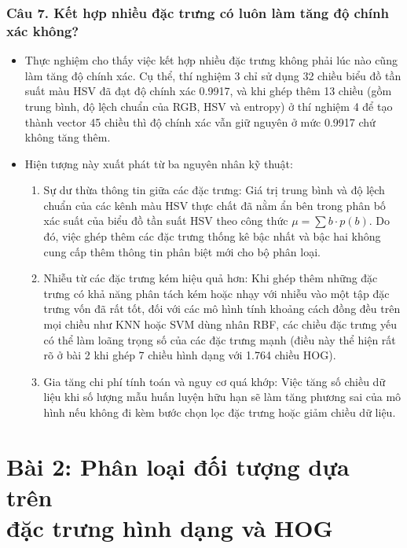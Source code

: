 \documentclass[12pt,a4paper]{article}
\begin{document}
\subsubsection*{Câu 7. Kết hợp nhiều đặc trưng có luôn làm tăng độ chính xác không?}
\begin{itemize}
    \item Thực nghiệm cho thấy việc kết hợp nhiều đặc trưng không phải lúc nào cũng làm tăng độ chính xác. Cụ thể, thí nghiệm 3 chỉ sử dụng 32 chiều biểu đồ tần suất màu HSV đã đạt độ chính xác 0.9917, và khi ghép thêm 13 chiều (gồm trung bình, độ lệch chuẩn của RGB, HSV và entropy) ở thí nghiệm 4 để tạo thành vector 45 chiều thì độ chính xác vẫn giữ nguyên ở mức 0.9917 chứ không tăng thêm.
    \item Hiện tượng này xuất phát từ ba nguyên nhân kỹ thuật:
    \begin{enumerate}
        \item Sự dư thừa thông tin giữa các đặc trưng: Giá trị trung bình và độ lệch chuẩn của các kênh màu HSV thực chất đã nằm ẩn bên trong phân bố xác suất của biểu đồ tần suất HSV theo công thức $\mu = \sum b \cdot p(b)$. Do đó, việc ghép thêm các đặc trưng thống kê bậc nhất và bậc hai không cung cấp thêm thông tin phân biệt mới cho bộ phân loại.
        \item Nhiễu từ các đặc trưng kém hiệu quả hơn: Khi ghép thêm những đặc trưng có khả năng phân tách kém hoặc nhạy với nhiễu vào một tập đặc trưng vốn đã rất tốt, đối với các mô hình tính khoảng cách đồng đều trên mọi chiều như KNN hoặc SVM dùng nhân RBF, các chiều đặc trưng yếu có thể làm loãng trọng số của các đặc trưng mạnh (điều này thể hiện rất rõ ở bài 2 khi ghép 7 chiều hình dạng với 1.764 chiều HOG).
        \item Gia tăng chi phí tính toán và nguy cơ quá khớp: Việc tăng số chiều dữ liệu khi số lượng mẫu huấn luyện hữu hạn sẽ làm tăng phương sai của mô hình nếu không đi kèm bước chọn lọc đặc trưng hoặc giảm chiều dữ liệu.
    \end{enumerate}
\end{itemize}

\newpage

\section[Bài 2: Phân loại đối tượng dựa trên đặc trưng hình dạng và HOG]{Bài 2: Phân loại đối tượng dựa trên\\đặc trưng hình dạng và HOG}
\end{document}
